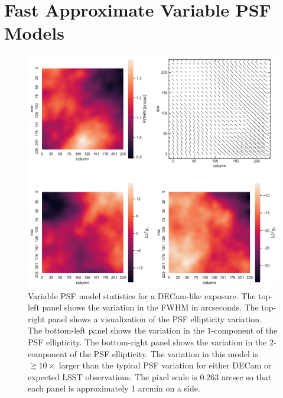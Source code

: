 \documentclass[fleqn,useAMS,usenatbib]{mnras}
\begin{document}



\appendix

\section{Fast Approximate Variable PSF Models}\label{app:pspsf}

\begin{figure}
  \includegraphics[width=\textwidth]{figures/pspsf.pdf}
  \caption{
    Variable PSF model statistics for a DECam-like exposure. The top-left
    panel shows the variation in the FWHM in arcseconds. The top-right panel
    shows a visualization of the PSF ellipticity variation. The bottom-left panel shows
    the variation in the $1$-component of the PSF ellipticity. The bottom-right panel
    shows the variation in the $2$-component of the PSF ellipticity. The variation in
    this model is $\gtrsim10\times$ larger than the typical PSF variation for
    either DECam or expected LSST observations. The pixel scale is 0.263 arcsec
    so that each panel is approximately 1 arcmin on a side.
    \label{fig:pspsf}}
\end{figure}
\end{document}
